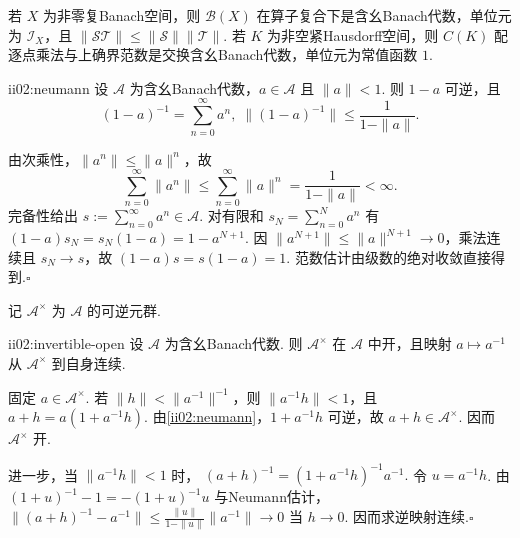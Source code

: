 \begin{FAExample}[两个基本Banach代数]
若 \(\displaystyle X\) 为非零复Banach空间，则 \(\displaystyle \mathcal B(X)\) 在算子复合下是含幺Banach代数，单位元为 \(\displaystyle \mathcal I_X\)，且 \(\displaystyle \|\mathcal S\mathcal T\|\leqslant\|\mathcal S\|\|\mathcal T\|\). 若 \(\displaystyle K\) 为非空紧Hausdorff空间，则 \(\displaystyle C(K)\) 配逐点乘法与上确界范数是交换含幺Banach代数，单位元为常值函数 \(\displaystyle1\).
\end{FAExample}

\begin{FALemma}[B][Banach代数中的Neumann引理]{ii02:neumann}
设 \(\displaystyle \mathcal A\) 为含幺Banach代数，\(\displaystyle a\in\mathcal A\) 且 \(\displaystyle \|a\|<1\). 则 \(\displaystyle1-a\) 可逆，且
\[
(1-a)^{-1}=\sum_{n=0}^{\infty}a^n,
\;
\|(1-a)^{-1}\|\leqslant\frac{1}{1-\|a\|}.
\]
\end{FALemma}

\begin{FAProof}
由次乘性，\(\displaystyle \|a^n\|\leqslant\|a\|^n\)，故
\[
\sum_{n=0}^{\infty}\|a^n\|
\leqslant
\sum_{n=0}^{\infty}\|a\|^n
=
\frac{1}{1-\|a\|}
<\infty.
\]
完备性给出 \(\displaystyle s:=\sum_{n=0}^{\infty}a^n\in\mathcal A\). 对有限和 \(\displaystyle s_N=\sum_{n=0}^{N}a^n\) 有 \(\displaystyle (1-a)s_N=s_N(1-a)=1-a^{N+1}\). 因 \(\displaystyle \|a^{N+1}\|\leqslant\|a\|^{N+1}\to0\)，乘法连续且 \(\displaystyle s_N\to s\)，故 \(\displaystyle (1-a)s=s(1-a)=1\). 范数估计由级数的绝对收敛直接得到.\hfill\(\square\)
\end{FAProof}

记 \(\displaystyle \mathcal A^\times\) 为 \(\displaystyle \mathcal A\) 的可逆元群.

\begin{FAProposition}[B][可逆元群的开性与求逆连续性]{ii02:invertible-open}
设 \(\displaystyle \mathcal A\) 为含幺Banach代数. 则 \(\displaystyle \mathcal A^\times\) 在 \(\displaystyle \mathcal A\) 中开，且映射 \(\displaystyle a\mapsto a^{-1}\) 从 \(\displaystyle \mathcal A^\times\) 到自身连续.
\end{FAProposition}

\begin{FAProof}
固定 \(\displaystyle a\in\mathcal A^\times\). 若 \(\displaystyle \|h\|<\|a^{-1}\|^{-1}\)，则 \(\displaystyle \|a^{-1}h\|<1\)，且
\(\displaystyle a+h=a(1+a^{-1}h).\)
由\autoref{ii02:neumann}，\(\displaystyle1+a^{-1}h\) 可逆，故 \(\displaystyle a+h\in\mathcal A^\times\). 因而 \(\displaystyle \mathcal A^\times\) 开.

进一步，当 \(\displaystyle \|a^{-1}h\|<1\) 时，
\(\displaystyle (a+h)^{-1}=(1+a^{-1}h)^{-1}a^{-1}.\)
令 \(\displaystyle u=a^{-1}h\). 由 \(\displaystyle (1+u)^{-1}-1=-(1+u)^{-1}u\) 与Neumann估计，
\(\displaystyle \|(a+h)^{-1}-a^{-1}\| \leqslant \frac{\|u\|}{1-\|u\|}\|a^{-1}\| \longrightarrow0\)
当 \(\displaystyle h\to0\). 因而求逆映射连续.\hfill\(\square\)
\end{FAProof}

